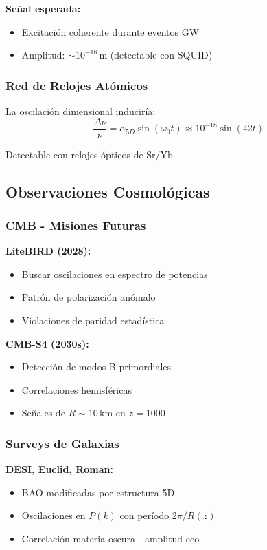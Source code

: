 \documentclass[12pt,a4paper]{article}
\begin{document}
\textbf{Señal esperada:}
\begin{itemize}
    \item Excitación coherente durante eventos GW
    \item Amplitud: $\sim 10^{-18}\,\mathrm{m}$ (detectable con SQUID)
\end{itemize}

\subsubsection{Red de Relojes Atómicos}

La oscilación dimensional induciría:
\begin{equation}
\frac{\Delta \nu}{\nu} = \alpha_{5D} \sin(\omega_0 t) \approx 10^{-18} \sin(42t)
\end{equation}

Detectable con relojes ópticos de Sr/Yb.

\subsection{Observaciones Cosmológicas}

\subsubsection{CMB - Misiones Futuras}

\textbf{LiteBIRD (2028):}
\begin{itemize}
    \item Buscar oscilaciones en espectro de potencias
    \item Patrón de polarización anómalo
    \item Violaciones de paridad estadística
\end{itemize}

\textbf{CMB-S4 (2030s):}
\begin{itemize}
    \item Detección de modos B primordiales
    \item Correlaciones hemisféricas
    \item Señales de $R \sim 10\,\mathrm{km}$ en $z=1000$
\end{itemize}

\subsubsection{Surveys de Galaxias}

\textbf{DESI, Euclid, Roman:}
\begin{itemize}
    \item BAO modificadas por estructura 5D
    \item Oscilaciones en $P(k)$ con período $2\pi/R(z)$
    \item Correlación materia oscura - amplitud eco
\end{itemize}
\end{document}
